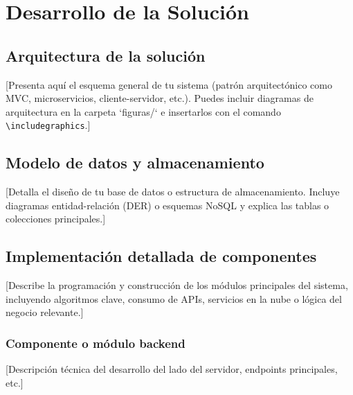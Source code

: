 
\chapter{Desarrollo de la Solución}


\section{Arquitectura de la solución}

[Presenta aquí el esquema general de tu sistema (patrón arquitectónico como MVC, microservicios, cliente-servidor, etc.). Puedes incluir diagramas de arquitectura en la carpeta `figuras/` e insertarlos con el comando \texttt{\textbackslash includegraphics}.]

\section{Modelo de datos y almacenamiento}

[Detalla el diseño de tu base de datos o estructura de almacenamiento. Incluye diagramas entidad-relación (DER) o esquemas NoSQL y explica las tablas o colecciones principales.]

\section{Implementación detallada de componentes}

[Describe la programación y construcción de los módulos principales del sistema, incluyendo algoritmos clave, consumo de APIs, servicios en la nube o lógica del negocio relevante.]

\subsection{Componente o módulo backend}
[Descripción técnica del desarrollo del lado del servidor, endpoints principales, etc.]

